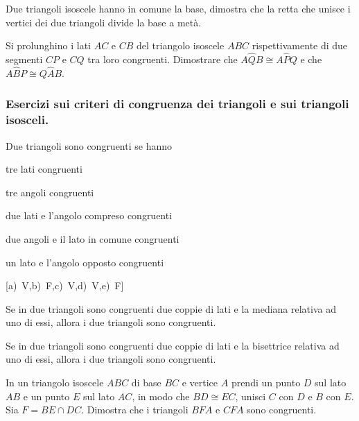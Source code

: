 \begin{multicols}{2}
\begin{esercizio}
\label{ese:2.46}
Due triangoli isoscele hanno in comune la base, dimostra che la retta 
che unisce i vertici dei due triangoli divide la base a metà.
\end{esercizio}

\begin{esercizio}
\label{ese:2.49}
Si prolunghino i lati \(AC\) e \(CB\) del triangolo isoscele \(ABC\) 
rispettivamente di due segmenti \(CP\) e \(CQ\) tra loro congruenti. 
Dimostrare che \(A\widehat{Q}B\cong A\widehat{P}Q\) e che 
\(A\widehat{B}P\cong Q\widehat{A}B\).
\end{esercizio}

\subsubsection*{Esercizi sui criteri di congruenza dei triangoli e 
sui triangoli isosceli.}

\begin{esercizio}
\label{ese:2.54}
Due triangoli sono congruenti se hanno
\begin{enumeratea}
\item tre lati congruenti \hfill\boxV\quad\boxF
\item tre angoli congruenti \hfill\boxV\quad\boxF
\item due lati e l'angolo compreso congruenti\tab\hfill\boxV\quad\boxF
\item due angoli e il lato in comune 
congruenti\tab\hfill\boxV\quad\boxF
\item un lato e l'angolo opposto 
congruenti\tab\tab\hfill\boxV\quad\boxF
\end{enumeratea}
\hfill[a)~V,\quad b)~F,\quad c)~V,\quad d)~V,\quad e)~F]
\end{esercizio}

\begin{esercizio}
\label{ese:2.58}
Se in due triangoli sono congruenti due coppie di lati e la mediana 
relativa ad uno di essi, allora i due triangoli sono congruenti.
\end{esercizio}

\begin{esercizio}
\label{ese:2.59}
Se in due triangoli sono congruenti due coppie di lati e la 
bisettrice relativa ad uno di essi, allora i due triangoli sono 
congruenti.
\end{esercizio}

\begin{esercizio}
\label{ese:2.63}
In un triangolo isoscele \(ABC\) di base \(BC\) e vertice \(A\) prendi un 
punto \(D\) sul lato \(AB\) e un punto \(E\) sul lato \(AC\), in modo che 
\(BD\cong EC\), unisci \(C\) con \(D\) e \(B\) con \(E\). Sia \(F=BE\cap DC\). 
Dimostra che i triangoli \(BFA\) e \(CFA\) sono congruenti.
\end{esercizio}


\end{multicols}
